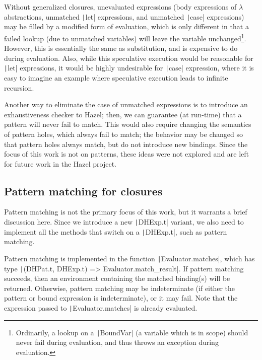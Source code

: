 Without generalized closures, unevaluated expressions (body expressions of $\lambda$ abstractions, unmatched \texttt|let| expressions, and unmatched \texttt|case| expressions) may be filled by a modified form of evaluation, which is only different in that a failed lookup (due to unmatched variables) will leave the variable unchanged\footnote{Ordinarily, a lookup on a \texttt|BoundVar| (a variable which is in scope) should never fail during evaluation, and thus throws an exception during evaluation.}. However, this is essentially the same as substitution, and is expensive to do during evaluation. Also, while this speculative execution would be reasonable for \texttt|let| expressions, it would be highly undesirable for \texttt|case| expression, where it is easy to imagine an example where speculative execution leads to infinite recursion.

Another way to eliminate the case of unmatched expressions is to introduce an exhaustiveness checker to Hazel; then, we can guarantee (at run-time) that a pattern will never fail to match. This would also require changing the semantics of pattern holes, which always fail to match; the behavior may be changed so that pattern holes always match, but do not introduce new bindings. Since the focus of this work is not on patterns, these ideas were not explored and are left for future work in the Hazel project.

\subsection{Pattern matching for closures}
\label{sec:generalized-closures-matching}

Pattern matching is not the primary focus of this work, but it warrants a brief discussion here. Since we introduce a new \texttt|DHExp.t| variant, we also need to implement all the methods that switch on a \texttt|DHExp.t|, such as pattern matching.

Pattern matching is implemented in the function \texttt|Evaluator.matches|, which has type \texttt|(DHPat.t, DHExp.t) => Evaluator.match_result|. If pattern matching succeeds, then an environment containing the matched binding(s) will be returned. Otherwise, pattern matching may be indeterminate (if either the pattern or bound expression is indeterminate), or it may fail. Note that the expression passed to \texttt|Evaluator.matches| is already evaluated.

